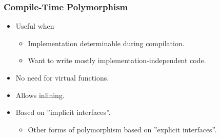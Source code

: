 \subsubsection{Compile-Time Polymorphism}
\begin{itemize}
  \item Useful when
  \begin{itemize}
    \item Implementation determinable during compilation.
    \item Want to write mostly implementation-independent code.
  \end{itemize}
  \item No need for virtual functions.
  \item Allows inlining.
  \item Based on ''implicit interfaces''.
  \begin{itemize}
    \item Other forms of polymorphism based on ''explicit interfaces''.
  \end{itemize}
\end{itemize}

